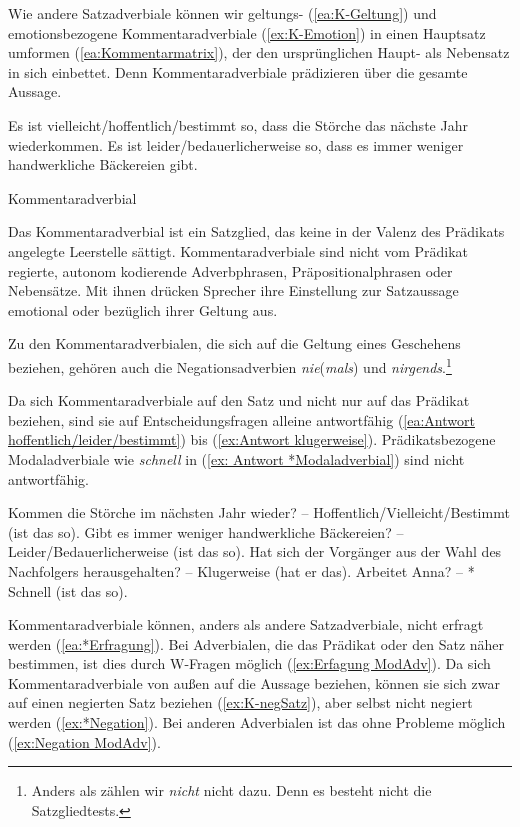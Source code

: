 Wie andere Satzadverbiale können wir geltungs- (\ref{ea:K-Geltung}) und emotionsbezogene Kommentaradverbiale (\ref{ex:K-Emotion}) in einen Hauptsatz umformen (\ref{ea:Kommentarmatrix}), der den ursprünglichen Haupt- als Nebensatz in sich einbettet. Denn Kommentaradverbiale prädizieren über die gesamte Aussage. 

\ea \label{ea:Kommentarmatrix}
\ea \label{ea:es ist vielleicht so} Es ist vielleicht/hoffentlich/bestimmt so, dass die Störche das nächste Jahr wiederkommen.
\ex \label{ex:es ist leider so} Es ist leider/bedauerlicherweise so, dass es immer weniger handwerkliche Bäckereien gibt.
\z 
\z 

\begin{Definition}{Kommentaradverbial}
    
\noindent Das Kommentaradverbial ist ein Satzglied, das keine in der Valenz des Prädikats angelegte Leerstelle sättigt. Kommentaradverbiale sind nicht vom Prädikat regierte, autonom kodierende Adverbphrasen, Präpositionalphrasen oder Nebensätze. Mit ihnen drücken Sprecher ihre Einstellung zur Satzaussage emotional oder bezüglich ihrer Geltung aus. 
\end{Definition}



Zu den Kommentaradverbialen, die sich auf die Geltung eines Geschehens beziehen, gehören auch die Negationsadverbien \textit{nie}(\textit{mals}) und \textit{nirgends}.\footnote{Anders als \citet[243]{Eisenberg2020_Satz} zählen wir \textit{nicht} nicht dazu. Denn es besteht nicht die Satzgliedtests.}  

Da sich Kommentaradverbiale auf den Satz und nicht nur auf das Prädikat beziehen, sind sie auf Entscheidungsfragen alleine antwortfähig (\ref{ea:Antwort hoffentlich/leider/bestimmt}) bis (\ref{ex:Antwort klugerweise}). Prädikatsbezogene Modaladverbiale wie \textit{schnell} in (\ref{ex: Antwort *Modaladverbial}) sind nicht antwortfähig. 

\ea \label{ea:Kg-antwortfähig}
\ea \label{ea:Antwort hoffentlich/leider/bestimmt} Kommen die Störche im nächsten Jahr wieder? -- Hoffentlich/Vielleicht/Bestimmt (ist das so).
\ex \label{ex:Antwort leider} Gibt es immer weniger handwerkliche Bäckereien? -- Leider/Bedauerlicherweise (ist das so).
\newpage
\ex \label{ex:Antwort klugerweise} Hat sich der Vorgänger aus der Wahl des Nachfolgers herausgehalten? -- Klugerweise (hat er das).
\ex \label{ex: Antwort *Modaladverbial} Arbeitet Anna? -- *\,Schnell (ist das so).
\z 
\z 

Kommentaradverbiale können, anders als andere Satzadverbiale, nicht erfragt werden (\ref{ea:*Erfragung}). Bei Adverbialen, die das Prädikat oder den Satz näher bestimmen, ist dies durch W-Fragen möglich (\ref{ex:Erfagung ModAdv}). Da sich Kommentaradverbiale von außen auf die Aussage beziehen, können sie sich zwar auf einen negierten Satz beziehen (\ref{ex:K-negSatz}), aber selbst nicht negiert werden (\ref{ex:*Negation}). Bei anderen Adverbialen ist das ohne Probleme möglich (\ref{ex:Negation ModAdv}).

